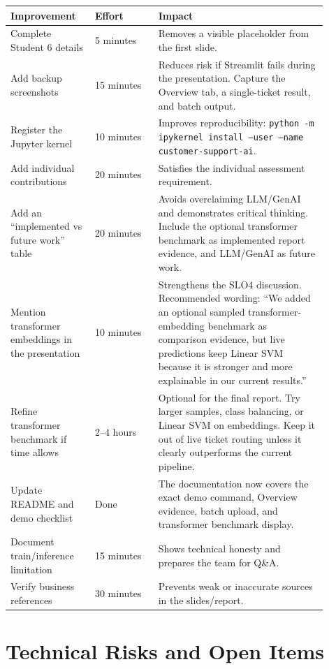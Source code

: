 \documentclass[11pt,a4paper]{article}
\newcommand{\done}{\textcolor{green!45!black}{Done}}
\begin{document}
\begin{longtable}{p{0.24\linewidth} p{0.18\linewidth} p{0.48\linewidth}}
\toprule
\textbf{Improvement} & \textbf{Effort} & \textbf{Impact} \\
\midrule
Complete Student 6 details & 5 minutes & Removes a visible placeholder from the first slide. \\
Add backup screenshots & 15 minutes & Reduces risk if Streamlit fails during the presentation. Capture the Overview tab, a single-ticket result, and batch output. \\
Register the Jupyter kernel & 10 minutes & Improves reproducibility: \texttt{python -m ipykernel install --user --name customer-support-ai}. \\
Add individual contributions & 20 minutes & Satisfies the individual assessment requirement. \\
Add an ``implemented vs future work'' table & 20 minutes & Avoids overclaiming LLM/GenAI and demonstrates critical thinking. Include the optional transformer benchmark as implemented report evidence, and LLM/GenAI as future work. \\
Mention transformer embeddings in the presentation & 10 minutes & Strengthens the SLO4 discussion. Recommended wording: ``We added an optional sampled transformer-embedding benchmark as comparison evidence, but live predictions keep Linear SVM because it is stronger and more explainable in our current results.'' \\
Refine transformer benchmark if time allows & 2--4 hours & Optional for the final report. Try larger samples, class balancing, or Linear SVM on embeddings. Keep it out of live ticket routing unless it clearly outperforms the current pipeline. \\
Update README and demo checklist & \done & The documentation now covers the exact demo command, Overview evidence, batch upload, and transformer benchmark display. \\
Document train/inference limitation & 15 minutes & Shows technical honesty and prepares the team for Q\&A. \\
Verify business references & 30 minutes & Prevents weak or inaccurate sources in the slides/report. \\
\bottomrule
\end{longtable}

\section{Technical Risks and Open Items}
\end{document}
